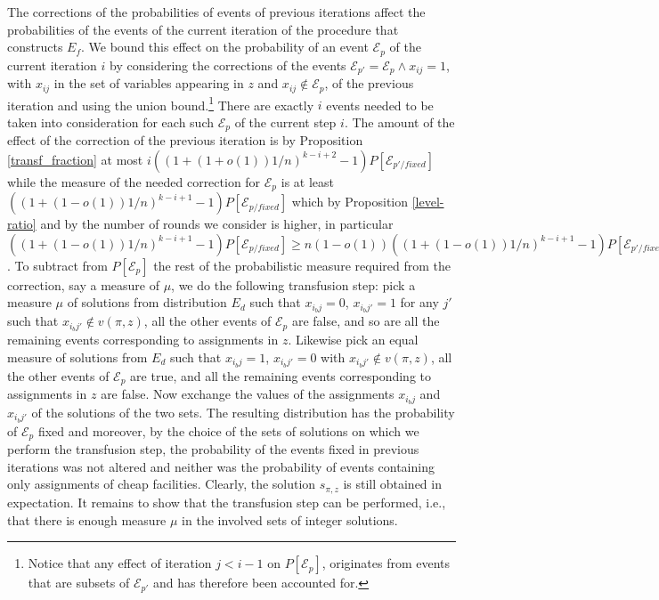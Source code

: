 \documentclass[11pt]{article}
\begin{document}
The corrections of the  probabilities of events of previous iterations
affect the probabilities of the events of the current iteration of the
procedure  that  constructs  $E_f$.   We  bound  this  effect  on  the
probability of  an event $\mathcal{E}_p$ of the  current iteration $i$
by     considering      the     corrections     of      the     events
$\mathcal{E}_{p'}=\mathcal{E}_p \wedge x_{ij}=1$, with $x_{ij}$ in the
set of variables appearing in $z$ and $x_{ij}\notin \mathcal{E}_p$, of
the previous iteration and using the union bound.\footnote{Notice that
  any  effect of iteration  $j< i-1$  on $P[\mathcal{E}_p]$, originates
  from events that are subsets of $\mathcal{E}_{p'}$ and has therefore
  been  accounted for.}   There are  exactly $i$  events needed  to be
taken into consideration for  each such $\mathcal{E}_p$ of the current
step $i$.  The amount of the  effect of the correction of the previous
iteration   is   by    Proposition   \ref{transf_fraction}   at   most
$i((1+(1+o(1))1/n)^{k-i+2}-1)P[\mathcal{E}_{p'/fixed}]$
while the measure of the  needed correction for $\mathcal{E}_p$ is at
 least  $((1+(1-o(1))1/n)^{k-i+1}-1)P[\mathcal{E}_{p/fixed}]$ which by
 Proposition \ref{level-ratio} and by the number of rounds we consider
 is                higher,                in                particular
 $((1+(1-o(1))1/n)^{k-i+1}-1)P[\mathcal{E}_{p/fixed}]\geq
 n(1-o(1))((1+(1-o(1))1/n)^{k-i+1}-1)P[\mathcal{E}_{p'/fixed}]>i((1+(1+o(1))1/n)^{k-i+2}-1)P[\mathcal{E}_{p'/fixed}]$. To
 subtract  from  $P[\mathcal{E}_p]$  the  rest  of  the  probabilistic
 measure required from  the correction, say a measure  of $\mu$, we do
 the  following transfusion step:  pick a  measure $\mu$  of solutions
 from distribution $E_d$ such that $x_{i_bj}=0$, $x_{i_bj'}=1$ for any
 $j'$ such that $x_{i_bj'} \notin  v(\pi ,z)$, all the other events of
 $\mathcal{E}_p$ are false, and so are all the remaining events
 corresponding to  assignments in $z$. Likewise pick  an equal measure
 of solutions  from $E_d$  such that $x_{i_bj}=1$,  $x_{i_bj'}=0$ with
 $x_{i_bj'} \notin v(\pi ,z)$, all the other events of $\mathcal{E}_p$
 are true,  and all the remaining events  corresponding to assignments
 in  $z$  are  false.  Now  exchange the  values  of  the  assignments
 $x_{i_bj}$  and $x_{i_bj'}$  of the  solutions of  the two  sets. The
 resulting distribution  has the probability  of $\mathcal{E}_p$ fixed
 and moreover,  by the  choice of  the sets of  solutions on  which we
 perform the transfusion step, the  probability of the events fixed in
 previous iterations  was not altered and neither  was the probability
 of events containing only assignments of cheap facilities.
Clearly, the solution $s_{\pi,z}$ is still obtained in expectation. 
 It remains to show that the transfusion step can be performed, i.e., that
  there is enough  measure $\mu$  in the  involved sets  of integer
 solutions.
\end{document}
